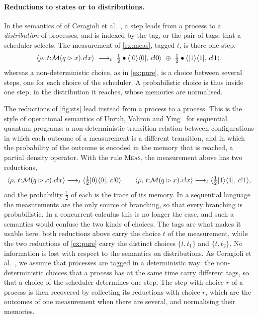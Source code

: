 \paragraph{Reductions to states or to distributions.}
In the semantics of \lqCCS of Ceragioli et al.~\cite{Ceragioli25}, a step
leads from a process to a \emph{distribution} of processes, and is indexed by
the tag, or the pair of tags, that a scheduler selects. The measurement of
\cref{ex:meas}, tagged $t$, is there one step,
\[
\langle \rho ,\, t{:}\mathcal{M}(q \rhd x).c!x \rangle
\ \longrightarrow_{t}\
\textstyle\frac{1}{2} \bullet \langle |0\rangle\langle 0| ,\, c!0 \rangle
\ \oplus\ \frac{1}{2} \bullet \langle |1\rangle\langle 1| ,\, c!1 \rangle ,
\]
whereas a non-deterministic choice, as in \cref{ex:pure}, is a choice between
several steps, one for each choice of the scheduler. A probabilistic choice
is thus inside one step, in the distribution it reaches, whose memories are
normalised.

The reductions of \cref{fig:sts} lead instead from a process to a process.
This is the style of operational semantics of Unruh, Valiron and
Ying~\cite{UVY26} for sequential quantum programs: a non-deterministic
transition relation between configurations in which each outcome of a
measurement is a different transition, and in which the probability of the
outcome is encoded in the memory that is reached, a partial density
operator. With the rule \textsc{Meas}, the measurement above has two
reductions,
\[
\langle \rho ,\, t{:}\mathcal{M}(q \rhd x).c!x \rangle \longrightarrow_{t}
\langle \textstyle\frac{1}{2}|0\rangle\langle 0| ,\, c!0 \rangle
\qquad
\langle \rho ,\, t{:}\mathcal{M}(q \rhd x).c!x \rangle \longrightarrow_{t}
\langle \textstyle\frac{1}{2}|1\rangle\langle 1| ,\, c!1 \rangle ,
\]
and the probability $\frac{1}{2}$ of each is the trace of its memory. In a
sequential language the measurements are the only source of branching, so
that every branching is probabilistic. In a concurrent calculus this is no
longer the case, and such a semantics would confuse the two kinds of
choices. The tags are what makes it usable here: both reductions above carry
the choice $t$ of the measurement, while the two reductions of
\cref{ex:pure} carry the distinct choices $\{t,t_1\}$ and $\{t,t_2\}$. No
information is lost with respect to the semantics on distributions. As
Ceragioli et al.~\cite{Ceragioli25}, we assume that processes are tagged in
a deterministic way: the non-deterministic choices that a process has at the
same time carry different tags, so that a choice of the scheduler determines
one step. The step with choice $r$ of a process is then recovered by
collecting its reductions with choice $r$, which are the outcomes of one
measurement when there are several, and normalising their memories.

